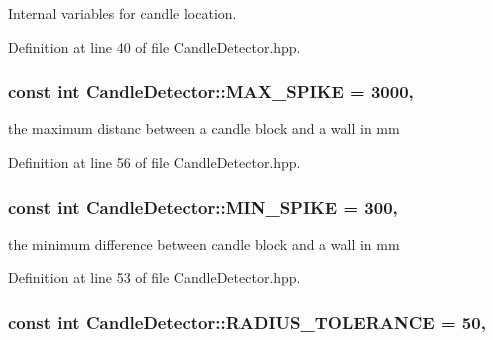 Internal variables for candle location. 



Definition at line 40 of file Candle\-Detector.\-hpp.

\hypertarget{classCandleDetector_a3903cd4085162f1fc38ca74cac3b954e}{
\subsubsection[{M\-A\-X\-\_\-\-S\-P\-I\-K\-E}]{\setlength{\rightskip}{0pt plus 5cm}const int Candle\-Detector\-::\-M\-A\-X\-\_\-\-S\-P\-I\-K\-E = 3000\hspace{0.3cm}{\ttfamily [static]}, {\ttfamily [private]}}}\label{classCandleDetector_a3903cd4085162f1fc38ca74cac3b954e}


the maximum distanc between a candle block and a wall in mm 



Definition at line 56 of file Candle\-Detector.\-hpp.

\hypertarget{classCandleDetector_a9062a3c45b98c5d051082dbf4a285fd5}{
\subsubsection[{M\-I\-N\-\_\-\-S\-P\-I\-K\-E}]{\setlength{\rightskip}{0pt plus 5cm}const int Candle\-Detector\-::\-M\-I\-N\-\_\-\-S\-P\-I\-K\-E = 300\hspace{0.3cm}{\ttfamily [static]}, {\ttfamily [private]}}}\label{classCandleDetector_a9062a3c45b98c5d051082dbf4a285fd5}


the minimum difference between candle block and a wall in mm 



Definition at line 53 of file Candle\-Detector.\-hpp.

\hypertarget{classCandleDetector_ab3c96353ba6d64163cf5e44b1ce2aa9e}{
\subsubsection[{R\-A\-D\-I\-U\-S\-\_\-\-T\-O\-L\-E\-R\-A\-N\-C\-E}]{\setlength{\rightskip}{0pt plus 5cm}const int Candle\-Detector\-::\-R\-A\-D\-I\-U\-S\-\_\-\-T\-O\-L\-E\-R\-A\-N\-C\-E = 50\hspace{0.3cm}{\ttfamily [static]}, {\ttfamily [private]}}}\label{classCandleDetector_ab3c96353ba6d64163cf5e44b1ce2aa9e}


